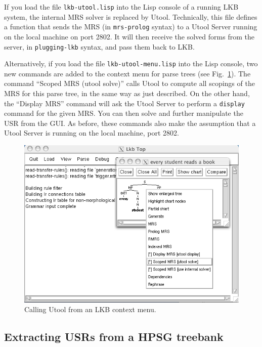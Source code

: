 If you load the file \verb|lkb-utool.lisp| into the Lisp console
of a running LKB system, the internal MRS solver is replaced by
Utool. Technically, this file defines a function that sends the MRS
(in \verb?mrs-prolog? syntax) to a Utool Server running on the local
machine on port 2802. It will then receive the solved forms from the
server, in \verb?plugging-lkb? syntax, and pass them back to LKB.

 Alternatively, if you load the file \verb|lkb-utool-menu.lisp|
into the Lisp console, two new commands are added to the context menu
for parse trees (see Fig.~\ref{fig:lkb-integration}). The command
``Scoped MRS (utool solve)'' calls Utool to compute all scopings of
the MRS for this parse tree, in the same way as just described. On the
other hand, the ``Display MRS'' command will ask the Utool Server to
perform a \verb?display? command for the given MRS. You can then solve
and further manipulate the USR from the GUI. As before, these commands
also make the assumption that a Utool Server is running on the local
machine, port 2802.


\begin{figure}
\begin{center}
\includegraphics[width=0.8 \textwidth]{lkb-integration}
\end{center}
\caption{Calling Utool from an LKB context menu.
\label{fig:lkb-integration}}
\end{figure}


\subsection{Extracting USRs from a HPSG treebank}
\label{sec:treebank}

